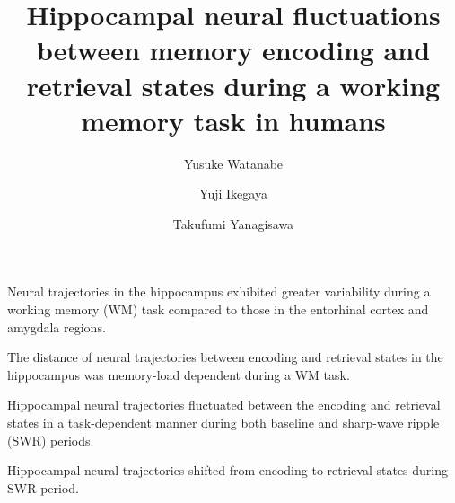 \documentclass[final,3p,times,twocolumn]{elsarticle}
\begin{document}
\begin{frontmatter}
\begin{highlights}

\item Neural trajectories in the hippocampus exhibited greater variability during a working memory (WM) task compared to those in the entorhinal cortex and amygdala regions.

\item The distance of neural trajectories between encoding and retrieval states in the hippocampus was memory-load dependent during a WM task.


\item Hippocampal neural trajectories fluctuated between the encoding and retrieval states in a task-dependent manner during both baseline and sharp-wave ripple (SWR) periods.

\item Hippocampal neural trajectories shifted from encoding to retrieval states during SWR period.

\end{highlights}\title{
Hippocampal neural fluctuations between memory encoding and retrieval states during a working memory task in humans
}\author[1]{Yusuke Watanabe}
\author[2,3,4]{Yuji Ikegaya}
\author[1,5]{Takufumi Yanagisawa}

\address[1]{Institute for Advanced Cocreation studies, Osaka University, 2-2 Yamadaoka, Suita, 565-0871, Osaka, Japan}
\address[2]{Graduate School of Pharmaceutical Sciences, The University of Tokyo, 7-3-1 Hongo, Tokyo, 113-0033, Japan}
\address[3]{Institute for AI and Beyond, The University of Tokyo, 7-3-1 Hongo, Tokyo, 113-0033, Japan}
\address[4]{Center for Information and Neural Networks, National Institute of Information and Communications Technology, 1-4 Yamadaoka, Suita City, 565-0871, Osaka, Japan}
\address[5]{Department of Neurosurgery, Osaka University Graduate School of Medicine, 2-2 Yamadaoka, Osaka, 565-0871, Japan}


\end{frontmatter}
\end{document}
